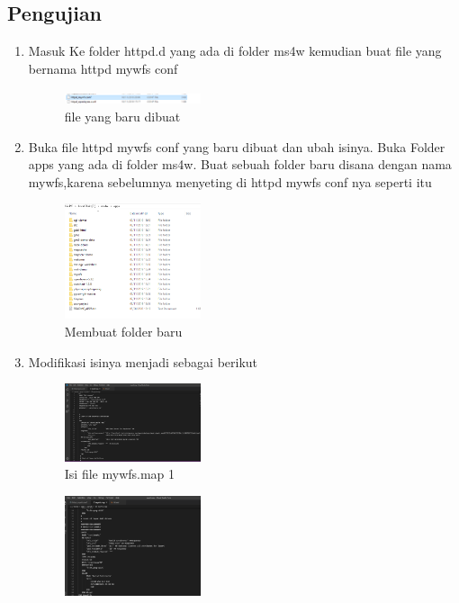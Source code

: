 \subsection{Pengujian}
\begin{enumerate}
  \item Masuk Ke folder httpd.d yang ada di folder ms4w kemudian buat file yang bernama httpd mywfs conf
  \hfill\break
    \begin{figure}[H]
    \includegraphics[width=4cm]{figures/1174096/4/g10.PNG}
    \centering
    \caption{file yang baru dibuat}
    \end{figure}
  \item Buka file httpd mywfs conf yang baru dibuat dan ubah isinya. Buka Folder apps yang ada di folder ms4w. Buat sebuah folder baru disana dengan nama mywfs,karena sebelumnya menyeting di httpd mywfs conf nya seperti itu
  \hfill\break
    \begin{figure}[H]
		\includegraphics[width=4cm]{figures/1174096/4/g11.PNG}
		\centering
		\caption{Membuat folder baru}
    \end{figure}
  \item Modifikasi isinya menjadi sebagai berikut
  \hfill\break
    \begin{figure}[H]
		\includegraphics[width=4cm]{figures/1174096/4/g12.PNG}
		\centering
		\caption{Isi file mywfs.map 1}
    \end{figure}
    \hfill\break
    \begin{figure}[H]
		\includegraphics[width=4cm]{figures/1174096/4/g13.PNG}

\end{figure}
\end{enumerate}
